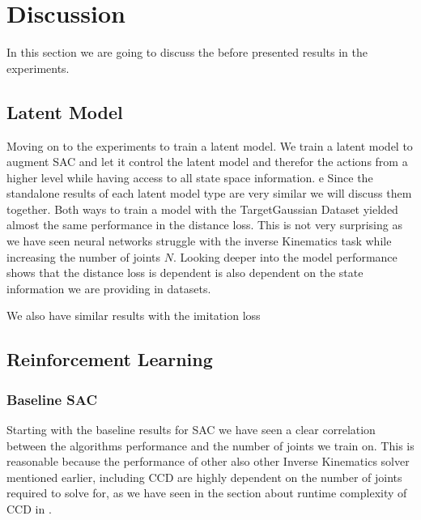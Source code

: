 \chapter{Discussion}\label{chap:discussion}

In this section we are going to discuss the before presented results in the experiments. 

\section{Latent Model}

Moving on to the experiments to train a latent model. We train a latent model to augment SAC and let it control the latent model and therefor the actions from a higher level while having access to all state space information.
e
Since the standalone results of each latent model type are very similar we will discuss them together.
Both ways to train a model with the TargetGaussian Dataset yielded almost the same performance in the distance loss. This is not very surprising as we have seen neural networks struggle with the inverse Kinematics task while increasing the number of joints $N$. Looking deeper into the model performance shows that the distance loss is dependent is also dependent on the state information we are providing in datasets.    

We also have similar results with the imitation loss

\section{Reinforcement Learning}

\subsection{Baseline SAC}

Starting with the baseline results for SAC we have seen a clear correlation between the algorithms performance and the number of joints we  train on. This is reasonable because the performance of other also other Inverse Kinematics solver mentioned earlier, including CCD are highly dependent on the number of joints required to solve for, as we have seen in the section about runtime complexity of CCD in .\\

